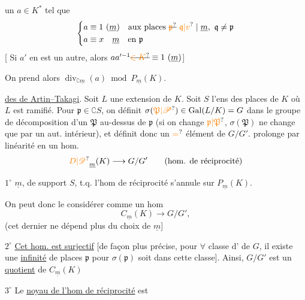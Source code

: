   un $a\in K^*$ tel que
\[
\left\{\begin{aligned}
a&\equiv1\ (\underline m)\quad\text{aux places }\deleted{\unsure{\mathfrak p}}\ \unsure{\mathfrak q|v}\mid\underline m,\ \mathfrak q\neq\mathfrak p\\
a&\equiv x\quad\underline m\quad\text{en }\mathfrak p
\end{aligned}\right.
\]
[ Si $a'$ en est un autre, alors $aa'^{-1}\deleted{\unsure{\in K}}\equiv1\ (\underline m)$]

On prend alors $\operatorname{div}_{\complement\underline m}(a)\bmod P_{\underline m}(K)$.

\uline{ des  de Artin--Takagi}. Soit $L$ une extension   de $K$.  Soit $S$ l'ens des places de $K$ où $L$ est ramifié. Pour $\mathfrak p\in\complement S$, on définit $\sigma(\unsure{\mathfrak P|\mathscr P})\in\operatorname{Gal}(L/K)=G$  dans le groupe de décomposition d'un $\mathfrak P$ au-dessus de $\mathfrak p$ (si on change $\unsure{\mathfrak p|\mathfrak P}$, $\sigma(\mathfrak P)$ ne change que par un aut. intérieur), et définit donc un $\unsure{=}$ élément de $G/G'$.   prolonge par linéarité en un hom.
\[
{\unsure{D|\mathscr{D}}}_{\underline m}(K)\longrightarrow G/G'\qquad(\text{hom. de réciprocité})
\]

\textcircled{$1^\circ$} \uline{} $\underline m$, de support $S$, t.q. l'hom de réciprocité s'annule sur $P_{\underline m}(K)$.

On peut donc le considérer comme un hom
\[
C_{\underline m}(K)\longrightarrow G/G',
\]
(cet dernier ne dépend plus du choix de $\underline m$]

\textcircled{$2^\circ$} \uline{Cet hom. est surjectif} [de façon plus précise, pour $\forall$ classe d' de $G$, il existe une \uline{infinité} de places $\mathfrak p$ pour  $\sigma(\mathfrak p)$ soit dans cette classe]. Ainsi, $G/G'$ est un \uline{quotient} de $C_{\underline m}(K)$

\textcircled{$3^\circ$} Le \uline{noyau de l'hom de réciprocité} est

